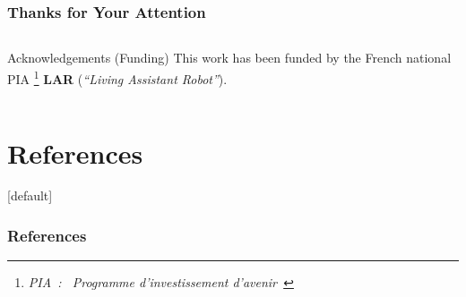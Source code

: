 \documentclass[10pt,c]{beamer}
\begin{document}

\section{}

\begin{frame}[b]
\frametitle{Thanks for Your Attention}
\begin{block}{}
\end{block}
\vspace{1.25cm}
\begin{columns}[c]
\begin{column}{8cm}
\begin{block}{\small Acknowledgements (Funding)}
\small
This work has been funded by the French national PIA
\footnote{\scriptsize\textsl{PIA~: \guillemotleft~Programme
d'investissement d'avenir~\guillemotright}}
\textbf{LAR} (\textit{``Living Assistant Robot''}).
\end{block}
\end{column}
\end{columns}
\vspace{0.3cm}
\end{frame}



\appendix

\section{References}

[default]{}


\begin{frame}[t]
\frametitle{References}
\tiny


\end{frame}



\end{document}
